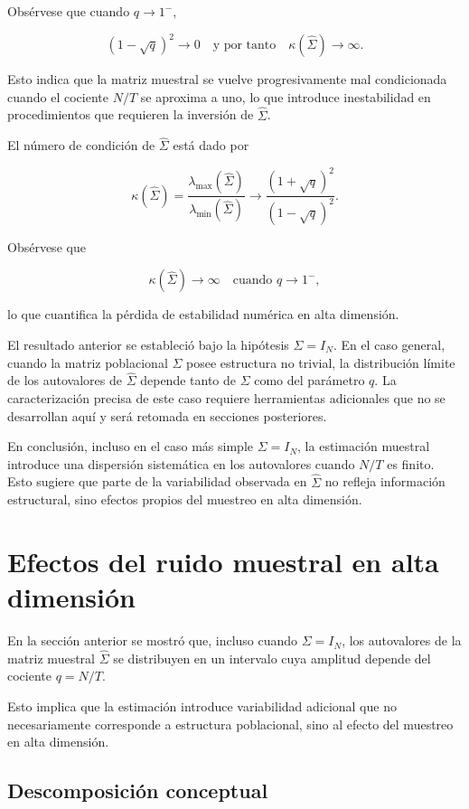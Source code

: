 \documentclass[letterpaper,12pt,oneside]{book}
\begin{document}
Obsérvese que cuando $q \to 1^{-}$,

\[
(1-\sqrt{q})^2 \to 0
\quad \text{y por tanto} \quad
\kappa(\widehat{\Sigma}) \to \infty.
\]

Esto indica que la matriz muestral se vuelve progresivamente mal condicionada cuando el cociente $N/T$ se aproxima a uno, lo que introduce inestabilidad en procedimientos que requieren la inversión de $\widehat{\Sigma}$.

El número de condición de $\widehat{\Sigma}$ está dado por

\[
\kappa(\widehat{\Sigma})
=
\frac{\lambda_{\max}(\widehat{\Sigma})}
{\lambda_{\min}(\widehat{\Sigma})}
\longrightarrow
\frac{(1+\sqrt{q})^2}{(1-\sqrt{q})^2}.
\]

Obsérvese que

\[
\kappa(\widehat{\Sigma}) \to \infty
\quad \text{cuando } q \to 1^{-},
\]

lo que cuantifica la pérdida de estabilidad numérica en alta dimensión.

El resultado anterior se estableció bajo la hipótesis $\Sigma = I_N$. En el caso general, cuando la matriz poblacional $\Sigma$ posee estructura no trivial, la distribución límite de los autovalores de $\widehat{\Sigma}$ depende tanto de $\Sigma$ como del parámetro $q$.
La caracterización precisa de este caso requiere herramientas adicionales que no se desarrollan aquí y será retomada en secciones posteriores.

En conclusión, incluso en el caso más simple $\Sigma = I_N$, la estimación muestral introduce una dispersión sistemática en los autovalores cuando $N/T$ es finito.
Esto sugiere que parte de la variabilidad observada en $\widehat{\Sigma}$ no refleja información estructural, sino efectos propios del muestreo en alta dimensión.

\section{Efectos del ruido muestral en alta dimensión}
En la sección anterior se mostró que, incluso cuando $\Sigma = I_N$, los autovalores de la matriz muestral
$\widehat{\Sigma}$ se distribuyen en un intervalo cuya amplitud depende del cociente $q = N/T$.

Esto implica que la estimación introduce variabilidad adicional que no necesariamente corresponde a estructura poblacional,
sino al efecto del muestreo en alta dimensión.

\subsection*{Descomposición conceptual}
\end{document}
